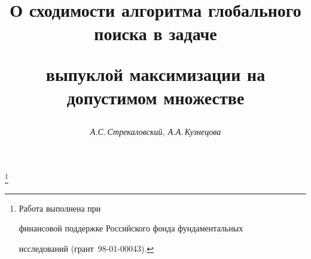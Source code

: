 









\newcommand{\tts}[1]{}







\setcounter{page}{74}















\author{\it А.С.\,Стрекаловский, А.А.\,Кузнецова}




\title{О сходимости алгоритма глобального поиска  в задаче


выпуклой максимизации на допустимом множестве}


\thanks{Работа выполнена при


финансовой поддержке Российского фонда фундаментальных


исследований (грант \No\,98-01-00043).}





\date{}




\pagestyle{plain} %







\maketitle


